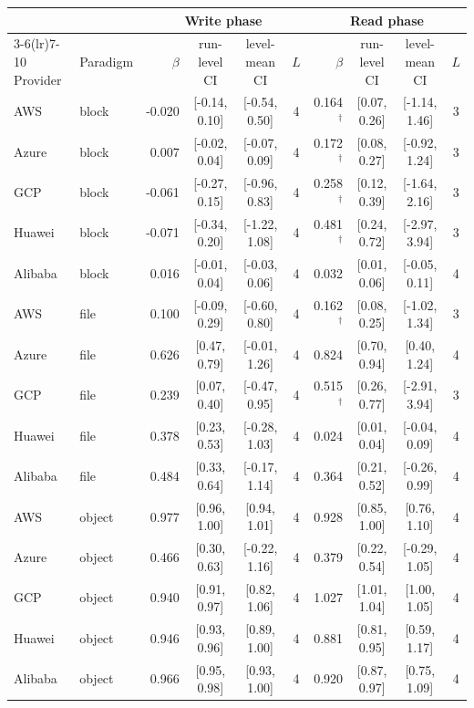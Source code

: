 \begin{tabular}{llrcccrccc}
\toprule
 & & \multicolumn{4}{c}{Write phase} & \multicolumn{4}{c}{Read phase} \\
\cmidrule(lr){3-6}\cmidrule(lr){7-10}
Provider & Paradigm & $\beta$ & run-level CI & level-mean CI & $L$ & $\beta$ & run-level CI & level-mean CI & $L$ \\
\midrule
AWS & block & -0.020 & [-0.14, 0.10] & [-0.54, 0.50] & 4 & 0.164$^{\dagger}$ & [0.07, 0.26] & [-1.14, 1.46] & 3 \\
Azure & block & 0.007 & [-0.02, 0.04] & [-0.07, 0.09] & 4 & 0.172$^{\dagger}$ & [0.08, 0.27] & [-0.92, 1.24] & 3 \\
GCP & block & -0.061 & [-0.27, 0.15] & [-0.96, 0.83] & 4 & 0.258$^{\dagger}$ & [0.12, 0.39] & [-1.64, 2.16] & 3 \\
Huawei & block & -0.071 & [-0.34, 0.20] & [-1.22, 1.08] & 4 & 0.481$^{\dagger}$ & [0.24, 0.72] & [-2.97, 3.94] & 3 \\
Alibaba & block & 0.016 & [-0.01, 0.04] & [-0.03, 0.06] & 4 & 0.032 & [0.01, 0.06] & [-0.05, 0.11] & 4 \\
\midrule
AWS & file & 0.100 & [-0.09, 0.29] & [-0.60, 0.80] & 4 & 0.162$^{\dagger}$ & [0.08, 0.25] & [-1.02, 1.34] & 3 \\
Azure & file & 0.626 & [0.47, 0.79] & [-0.01, 1.26] & 4 & 0.824 & [0.70, 0.94] & [0.40, 1.24] & 4 \\
GCP & file & 0.239 & [0.07, 0.40] & [-0.47, 0.95] & 4 & 0.515$^{\dagger}$ & [0.26, 0.77] & [-2.91, 3.94] & 3 \\
Huawei & file & 0.378 & [0.23, 0.53] & [-0.28, 1.03] & 4 & 0.024 & [0.01, 0.04] & [-0.04, 0.09] & 4 \\
Alibaba & file & 0.484 & [0.33, 0.64] & [-0.17, 1.14] & 4 & 0.364 & [0.21, 0.52] & [-0.26, 0.99] & 4 \\
\midrule
AWS & object & 0.977 & [0.96, 1.00] & [0.94, 1.01] & 4 & 0.928 & [0.85, 1.00] & [0.76, 1.10] & 4 \\
Azure & object & 0.466 & [0.30, 0.63] & [-0.22, 1.16] & 4 & 0.379 & [0.22, 0.54] & [-0.29, 1.05] & 4 \\
GCP & object & 0.940 & [0.91, 0.97] & [0.82, 1.06] & 4 & 1.027 & [1.01, 1.04] & [1.00, 1.05] & 4 \\
Huawei & object & 0.946 & [0.93, 0.96] & [0.89, 1.00] & 4 & 0.881 & [0.81, 0.95] & [0.59, 1.17] & 4 \\
Alibaba & object & 0.966 & [0.95, 0.98] & [0.93, 1.00] & 4 & 0.920 & [0.87, 0.97] & [0.75, 1.09] & 4 \\
\bottomrule
\end{tabular}

